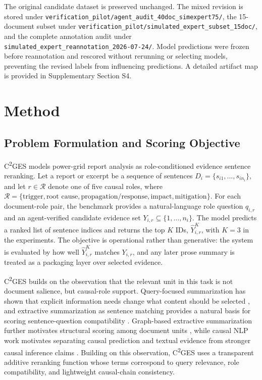 \documentclass{article}
\begin{document}
The original candidate dataset is preserved unchanged. The mixed revision is stored under \texttt{verification_pilot/agent_audit_40doc_simexpert75/}, the 15-document subset under \texttt{verification_pilot/simulated_expert_subset_15doc/}, and the complete annotation audit under \texttt{simulated_expert_reannotation_2026-07-24/}. Model predictions were frozen before reannotation and rescored without rerunning or selecting models, preventing the revised labels from influencing predictions. A detailed artifact map is provided in Supplementary Section S4.

\section{Method}
\label{sec:method}

\subsection{Problem Formulation and Scoring Objective}
\label{sec:problem_formulation}

C\textsuperscript{2}GES models power-grid report analysis as role-conditioned evidence sentence reranking. Let a report or excerpt be a sequence of sentences $D_i=\{s_{i1},\ldots,s_{in_i}\}$, and let $r\in\mathcal{R}$ denote one of five causal roles, where $\mathcal{R}=\{\text{trigger},\text{root cause},\text{propagation/response},\text{impact},\text{mitigation}\}$. For each document-role pair, the benchmark provides a natural-language role question $q_{i,r}$ and an agent-verified candidate evidence set $Y_{i,r}\subseteq \{1,\ldots,n_i\}$. The model predicts a ranked list of sentence indices and returns the top $K$ IDs, $\hat{Y}_{i,r}^{K}$, with $K=3$ in the experiments. The objective is operational rather than generative: the system is evaluated by how well $\hat{Y}_{i,r}^{K}$ matches $Y_{i,r}$, and any later prose summary is treated as a packaging layer over selected evidence.

C\textsuperscript{2}GES builds on the observation that the relevant unit in this task is not document salience, but causal-role support. Query-focused summarization has shown that explicit information needs change what content should be selected \cite{zhong2021qmsum,vig2022exploring}, and extractive summarization as sentence matching provides a natural basis for scoring sentence-question compatibility \cite{zhong2020extractive}. Graph-based extractive summarization further motivates structural scoring among document units \cite{wang2020heterogeneous,jing2021multiplex}, while causal NLP work motivates separating causal prediction and textual evidence from stronger causal inference claims \cite{feder2022causal}. Building on this observation, C\textsuperscript{2}GES uses a transparent additive reranking function whose terms correspond to query relevance, role compatibility, and lightweight causal-chain consistency.
\end{document}
